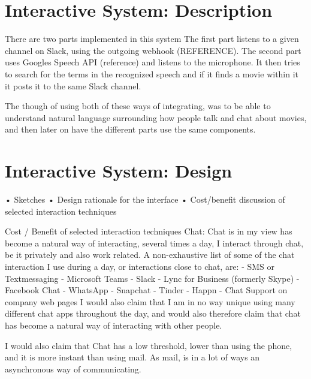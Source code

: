 \documentclass[11pt,fleqn]{book} %
\begin{document}

\chapter{Interactive System: Description}
There are two parts implemented in this system
The first part listens to a given channel on Slack, using the outgoing webhook (REFERENCE). 
The second part uses Googles Speech API (reference) and listens to the microphone. It then tries to search for the terms in the recognized speech and if it finds a movie within it it posts it to the same Slack channel.

The though of using both of these ways of integrating, was to be able to understand natural language surrounding how people talk and chat about movies, and then later on have the different parts use the same components.




\chapter{Interactive System: Design}
•	Sketches
•	Design rationale for the interface
•	Cost/benefit discussion of selected interaction techniques

Cost / Benefit of selected interaction techniques
Chat:
Chat is in my view has become a natural way of interacting, several times a day, I interact through chat, be it privately and also work related. A non-exhaustive list of some of the chat interaction I use during a day, or interactions close to chat, are:
- SMS or Textmessaging
- Microsoft Teams
- Slack
- Lync for Business (formerly Skype)
- Facebook Chat
- WhatsApp
- Snapchat 
- Tinder
- Happn
- Chat Support on company web pages
I would also claim that I am in no way unique using many different chat apps throughout the day, and would also therefore claim that chat has become a natural way of interacting with other people.

I would also claim that Chat has a low threshold, lower than using the phone, and it is more instant than using mail. As mail, is in a lot of ways an asynchronous way of communicating.
\end{document}
